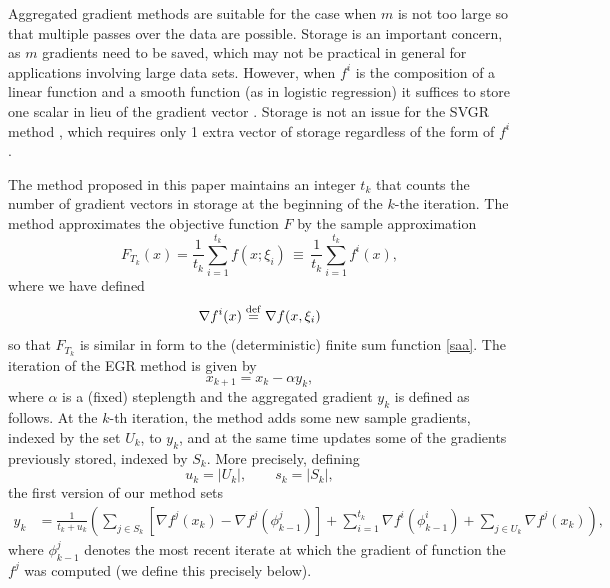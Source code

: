 \documentclass[11pt]{article}
\newcommand{\defeq}{\stackrel{\rm def}{=}}
\begin{document}
Aggregated gradient methods are suitable for the case when $m$ is not too large so that multiple passes over the data are possible. Storage is an important concern, as $m$ gradients need to be saved, which may not be practical in general for applications involving large data sets. However,  when $f^i$ is the composition of a linear function and a smooth function (as in logistic regression) it suffices to store one scalar in lieu of the gradient vector \cite{roux2012stochastic}. Storage is not an issue for the SVGR method \cite{johnson2013accelerating}, which requires only 1 extra vector of storage regardless of the form of $f^i$.

The  method proposed in this paper maintains an integer $t_k $ that counts the number of gradient vectors in storage at the beginning of the $k$-the iteration. The method approximates the objective function $F$ by the sample approximation
\begin{equation}  \label{batch}
	F_{T_k}(x)= \frac{1}{t_k} \sum_{i =1}^{ t_k} f(x; \xi_i) \, \equiv \,  \frac{1}{t_k} \sum_{i =1}^{ t_k} f^i (x) ,
\end{equation}
where  we have defined
\begin{equation} \label{spring}
	\nabla f^i(x) \defeq \nabla f(x, \xi_i) 
\end{equation}
so that $F_{T_k}$ is similar in form to the (deterministic) finite sum function \eqref{saa}.
The iteration of the EGR method is given by
\begin{equation}  \label{egri}
        x_{k+1}= x_k - \alpha y_k ,
\end{equation}
where $\alpha$ is a (fixed) steplength and the aggregated gradient $y_k$ is defined as follows. At the $k$-th iteration, the method adds some new sample gradients, indexed by the set $U_k$, to $y_k$, and at the same time updates some of the gradients previously stored, indexed by $S_k$. More precisely, defining
\begin{equation}   \label{usdef}
      u_k = | U_k |, \qquad s_k = | S_k |,
\end{equation}
the first version of our method sets
\begin{align}  \label{ysag}
      y_k & =  \frac{1}{t_{k}+u_k}  \left( \sum_{j \in S_k} \left[  \nabla f^j(x_{k}) -  \nabla f^j(\phi_{k-1}^j)\right]+ \sum_{i = 1}^{t_{k} }  \nabla f^i (\phi^i_{k-1})  + \sum_{j \in U_k} \nabla f^j(x_k) \right) ,
\end{align}
where  $\phi_{k-1}^j$ denotes the most recent iterate at which the gradient of function the $f^j$ was computed (we define this precisely below). 
\end{document}
